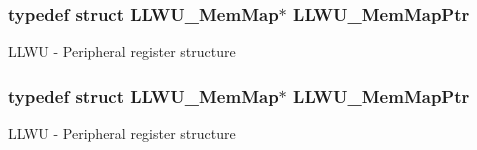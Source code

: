 \subsubsection[{\texorpdfstring{L\+L\+W\+U\+\_\+\+Mem\+Map\+Ptr}{LLWU_MemMapPtr}}]{\setlength{\rightskip}{0pt plus 5cm}typedef struct {\bf L\+L\+W\+U\+\_\+\+Mem\+Map}$\ast$ {\bf L\+L\+W\+U\+\_\+\+Mem\+Map\+Ptr}}\hypertarget{group___l_l_w_u___peripheral_ga03cfefad45ecbfeb2cd16eb85ccfe186}{}\label{group___l_l_w_u___peripheral_ga03cfefad45ecbfeb2cd16eb85ccfe186}
L\+L\+WU -\/ Peripheral register structure 
\subsubsection[{\texorpdfstring{L\+L\+W\+U\+\_\+\+Mem\+Map\+Ptr}{LLWU_MemMapPtr}}]{\setlength{\rightskip}{0pt plus 5cm}typedef struct {\bf L\+L\+W\+U\+\_\+\+Mem\+Map}$\ast$ {\bf L\+L\+W\+U\+\_\+\+Mem\+Map\+Ptr}}\hypertarget{group___l_l_w_u___peripheral_ga03cfefad45ecbfeb2cd16eb85ccfe186}{}\label{group___l_l_w_u___peripheral_ga03cfefad45ecbfeb2cd16eb85ccfe186}
L\+L\+WU -\/ Peripheral register structure 